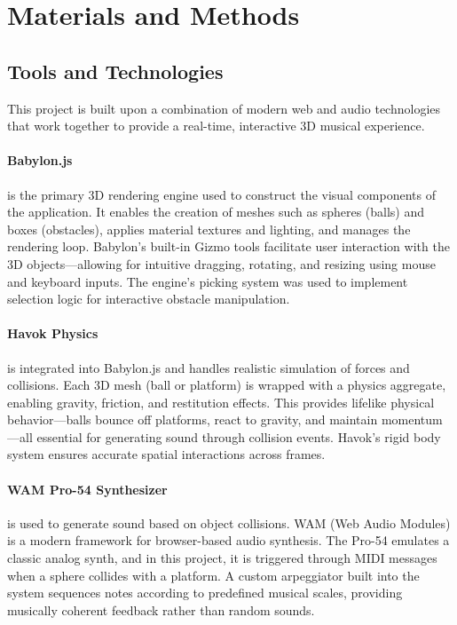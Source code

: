 \documentclass[a4paper,11pt]{article}
\begin{document}
\section{Materials and Methods}
\subsection{Tools and Technologies}

This project is built upon a combination of modern web and audio technologies that work together to provide a real-time, interactive 3D musical experience.

\paragraph{Babylon.js} is the primary 3D rendering engine used to construct the visual components of the application. It enables the creation of meshes such as spheres (balls) and boxes (obstacles), applies material textures and lighting, and manages the rendering loop. Babylon’s built-in Gizmo tools facilitate user interaction with the 3D objects—allowing for intuitive dragging, rotating, and resizing using mouse and keyboard inputs. The engine's picking system was used to implement selection logic for interactive obstacle manipulation.

\paragraph{Havok Physics} is integrated into Babylon.js and handles realistic simulation of forces and collisions. Each 3D mesh (ball or platform) is wrapped with a physics aggregate, enabling gravity, friction, and restitution effects. This provides lifelike physical behavior—balls bounce off platforms, react to gravity, and maintain momentum—all essential for generating sound through collision events. Havok’s rigid body system ensures accurate spatial interactions across frames.

\paragraph{WAM Pro-54 Synthesizer} is used to generate sound based on object collisions. WAM (Web Audio Modules) is a modern framework for browser-based audio synthesis. The Pro-54 emulates a classic analog synth, and in this project, it is triggered through MIDI messages when a sphere collides with a platform. A custom arpeggiator built into the system sequences notes according to predefined musical scales, providing musically coherent feedback rather than random sounds.
\end{document}
